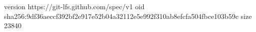 version https://git-lfs.github.com/spec/v1
oid sha256:9df36aeccf392bf2e917e52b04a32112e5e992f310ab8efcfa504fbce103b59c
size 23840
